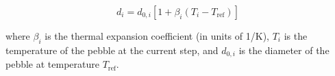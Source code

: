 \begin{equation}
	d_i = d_{0,i}\left[1+\beta_i\left(T_i - T_\text{ref}\right)\right]
\end{equation}

where $\beta_i$ is the thermal expansion coefficient (in units of \si{1/K}), $T_i$ is the temperature of the pebble at the current step, and $d_{0,i}$ is the diameter of the pebble at temperature $T_\text{ref}$.

